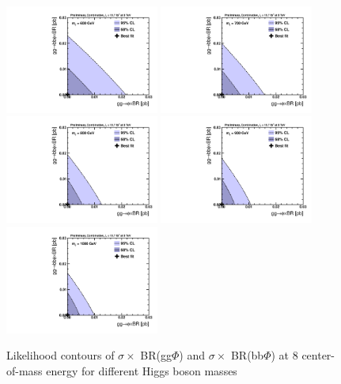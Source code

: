\begin{figure}[!h]\begin{center}
 \includegraphics[width=0.45\textwidth]{MSSM/PLOTS/cmb-ggH-bbH-scan-GGH-BBH-600.pdf}
 \includegraphics[width=0.45\textwidth]{MSSM/PLOTS/cmb-ggH-bbH-scan-GGH-BBH-700.pdf}
 \includegraphics[width=0.45\textwidth]{MSSM/PLOTS/cmb-ggH-bbH-scan-GGH-BBH-800.pdf}
 \includegraphics[width=0.45\textwidth]{MSSM/PLOTS/cmb-ggH-bbH-scan-GGH-BBH-900.pdf}
 \includegraphics[width=0.45\textwidth]{MSSM/PLOTS/cmb-ggH-bbH-scan-GGH-BBH-1000.pdf}
 \caption{Likelihood contours of $\sigma\times$ BR(gg$\Phi$) and $\sigma\times$ BR(bb$\Phi$) at 8 \TeV center-of-mass energy for different Higgs boson masses}
  \label{fig:contour4}\end{center}\end{figure}

